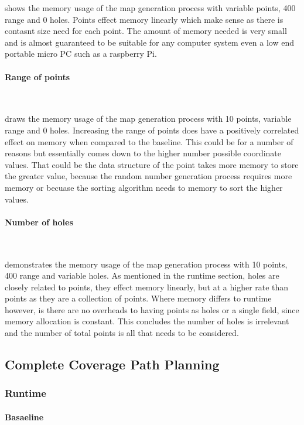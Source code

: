 \documentclass[final]{cmpreport_02}
\begin{document}
 shows the memory usage of the map generation process with variable points, 400 range and 0 holes.
Points effect memory linearly which make sense as there is contasnt size need for each point.
The amount of memory needed is very small and is almost guaranteed to be suitable for any computer system even a low end portable micro PC such as a raspberry Pi.


\paragraph{Range of points} \

 draws the memory usage of the map generation process with 10 points, variable range and 0 holes.
Increasing the range of points does have a positively correlated effect on memory when compared to the baseline.
This could be for a number of reasons but essentially comes down to the higher number possible coordinate values.
That could be the data structure of the point takes more memory to store the greater value, because the random number generation process requires more memory or becuase the sorting algorithm needs to memory to sort the higher values.

\paragraph{Number of holes} \

 demonstrates the memory usage of the map generation process with 10 points, 400 range and variable holes.
As mentioned in the runtime section, holes are closely related to points, they effect memory linearly, but at a higher rate than points as they are a collection of points.
Where memory differs to runtime however, is there are no overheads to having points as holes or a single field, since memory allocation is constant.
This concludes the number of holes is irrelevant and the number of total points is all that needs to be considered.


\subsection{Complete Coverage Path Planning}
\subsubsection{Runtime}
\paragraph{Basaeline} \
\end{document}
